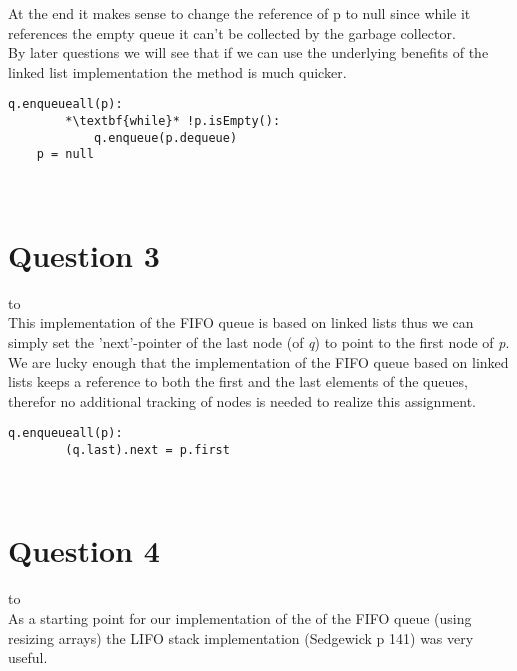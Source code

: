 \documentclass[a4paper]{article}
\def\headline#1{\hbox to \hsize{\hrulefill\quad\lower.3em\hbox{#1}\quad\hrulefill}}
\begin{document}
\noindent
At the end it makes sense to change the reference of p to null since while it references the empty queue it can't be collected by the garbage collector. 
\ \\

\noindent
By later questions we will see that if we can use the underlying benefits of the linked list implementation the method is much quicker.
 \\

\noindent

\begin{lstlisting}[escapeinside={{*}{*}}]
    q.enqueueall(p):
        *\textbf{while}* !p.isEmpty():
            q.enqueue(p.dequeue)
    p = null
\end{lstlisting}

\ \\
\section*{Question 3}
\headline{-} \ \\
This implementation of the FIFO queue is based on linked lists thus we can simply set the 
'next'-pointer of the last node (of \textit{q}) to point to the first node of \textit{p}.
\\

\noindent
We are lucky enough that the implementation of the FIFO queue based on linked lists keeps a reference to both the first and the last elements of the queues, therefor no additional tracking of nodes is needed to realize this assignment.
 \\

\noindent

\begin{lstlisting}[escapeinside={{*}{*}}]
    q.enqueueall(p):
        (q.last).next = p.first
\end{lstlisting}
 
\ \\

\newpage
\section*{Question 4}
\headline{-} \ \\

\noindent
As a starting point for our implementation of the  of the FIFO queue (using resizing arrays) the LIFO stack implementation (Sedgewick p 141) was very useful.
\ \\
\end{document}
